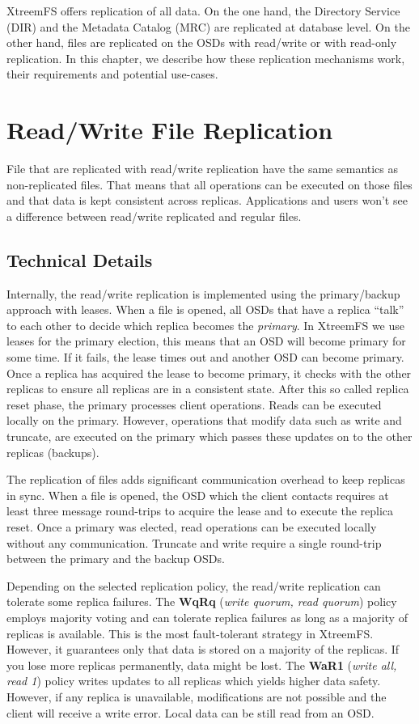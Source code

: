 \documentclass[a4paper,10pt]{book}
\begin{document}
XtreemFS offers replication of all data. On the one hand, the Directory Service (DIR) and the Metadata Catalog (MRC) are replicated at database level. On the other hand, files are replicated on the OSDs with read/write or with read-only replication. In this chapter, we describe how these replication mechanisms work, their requirements and potential use-cases.

\section{Read/Write File Replication}
\label{sec:readwrite_replication}
File that are replicated with read/write replication have the same semantics as non-replicated files. That means that all operations can be executed on those files and that data is kept consistent across replicas. Applications and users won't see a difference between read/write replicated and regular files.

\subsection{Technical Details}
Internally, the read/write replication is implemented using the primary/backup approach with leases. When a file is opened, all OSDs that have a replica ``talk'' to each other to decide which replica becomes the \textit{primary}. In XtreemFS we use leases for the primary election, this means that an OSD will become primary for some time. If it fails, the lease times out and another OSD can become primary.
Once a replica has acquired the lease to become primary, it checks with the other replicas to ensure all replicas are in a consistent state. After this so called replica reset phase, the primary processes client operations.
Reads can be executed locally on the primary. However, operations that modify data such as write and truncate, are executed on the primary which passes these updates on to the other replicas (backups).

The replication of files adds significant communication overhead to keep replicas in sync. When a file is opened, the OSD which the client contacts requires at least three message round-trips to acquire the lease and to execute the replica reset. Once a primary was elected, read operations can be executed locally without any communication. Truncate and write require a single round-trip between the primary and the backup OSDs.

Depending on the selected replication policy, the read/write replication can tolerate some replica failures. The \textbf{WqRq} (\textit{write quorum, read quorum}) policy employs majority voting and can tolerate replica failures as long as a majority of replicas is available. This is the most fault-tolerant strategy in XtreemFS. However, it guarantees only that data is stored on a majority of the replicas. If you lose more replicas permanently, data might be lost.
The \textbf{WaR1} (\textit{write all, read 1}) policy writes updates to all replicas which yields higher data safety. However, if any replica is unavailable, modifications are not possible and the client will receive a write error. Local data can be still read from an OSD.
\end{document}
